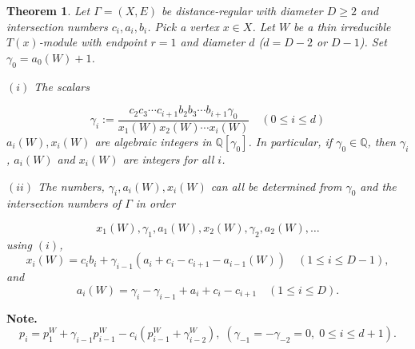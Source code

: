 \documentclass[
]{book}
\newtheorem{theorem}{Theorem}[chapter]
\theoremstyle{definition}
\theoremstyle{definition}
\theoremstyle{definition}
\theoremstyle{definition}
\theoremstyle{remark}
\begin{document}
\begin{theorem}
\protect\hypertarget{thm:endpoint1}{}\label{thm:endpoint1}Let \(\Gamma = (X, E)\) be distance-regular with diameter \(D\geq 2\) and intersection numbers \(c_i, a_i, b_i\). Pick a vertex \(x\in X\). Let \(W\) be a thin irreducible \(T(x)\)-module with endpoint \(r = 1\) and diameter \(d\) (\(d = D-2\) or \(D-1\)). Set \(\gamma_0 = a_0(W) + 1\).

\((i)\) The scalars

\begin{equation}
\gamma_i := \frac{c_2c_3\cdots c_{i+1}b_2b_3\cdots b_{i+1}\gamma_0}{x_1(W)x_2(W)\cdots x_i(W)}   \quad (0\leq i\leq d)
\label{eq:gamma}
\end{equation}
\(a_i(W), x_i(W)\) are algebraic integers in \(\mathbb{Q}[\gamma_0]\). In particular, if \(\gamma_0\in \mathbb{Q}\), then \(\gamma_i\), \(a_i(W)\) and \(x_i(W)\) are integers for all \(i\).

\((ii)\) The numbers, \(\gamma_i, a_i(W), x_i(W)\) can all be determined from \(\gamma_0\) and the intersection numbers of \(\Gamma\) in order

\[x_1(W), \gamma_1, a_1(W), x_2(W), \gamma_2, a_2(W), \ldots \]
using \((i)\),
\begin{equation}
x_i(W) = c_ib_i + \gamma_{i-1}(a_i + c_i - c_{i+1} - a_{i-1}(W)) \quad (1\leq i\leq D-1), \label{eq:xi}
\end{equation}
and
\begin{equation}
a_i(W) = \gamma_i - \gamma_{i-1} + a_i + c_i - c_{i+1} \quad (1\leq i\leq D). \label{eq:ai}
\end{equation}
\end{theorem}

\textbf{Note.}
\[p_i = p_1^W + \gamma_{i-1}p^W_{i-1} - c_i(p_{i-1}^W + \gamma_{i-2}^W), \; (\gamma_{-1} = -\gamma_{-2} = 0, \; 0\leq i\leq d+1).\]
\end{document}
